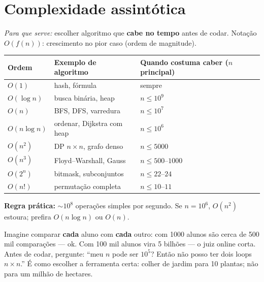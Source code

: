 
\section{Complexidade assintótica}

\emph{Para que serve:} escolher algoritmo que \textbf{cabe no tempo} antes de codar.
Notação $O(f(n))$: crescimento no pior caso (ordem de magnitude).

\begin{center}
\begin{tabular}{@{}p{2.2cm}p{4.2cm}p{5.5cm}@{}}
  \toprule
  Ordem & Exemplo de algoritmo & Quando costuma caber ($n$ principal) \\
  \midrule
  $O(1)$ & hash, fórmula & sempre \\
  $O(\log n)$ & busca binária, heap & $n \le 10^9$ \\
  $O(n)$ & BFS, DFS, varredura & $n \le 10^7$ \\
  $O(n \log n)$ & ordenar, Dijkstra com heap & $n \le 10^6$ \\
  $O(n^2)$ & DP $n\times n$, grafo denso & $n \le 5000$ \\
  $O(n^3)$ & Floyd--Warshall, Gauss & $n \le 500$--$1000$ \\
  $O(2^n)$ & bitmask, subconjuntos & $n \le 22$--$24$ \\
  $O(n!)$ & permutação completa & $n \le 10$--$11$ \\
  \bottomrule
\end{tabular}
\end{center}

\textbf{Regra prática:} $\sim 10^8$ operações simples por segundo. Se $n = 10^6$, $O(n^2)$ estoura; prefira $O(n\log n)$ ou $O(n)$.

\begin{exemplodiabox}
Imagine comparar \textbf{cada} aluno com \textbf{cada} outro: com 1000 alunos são cerca de 500 mil comparações --- ok. Com 100 mil alunos vira 5 bilhões --- o juiz online corta. Antes de codar, pergunte: ``meu $n$ pode ser $10^5$? Então não posso ter dois loops $n \times n$.'' É como escolher a ferramenta certa: colher de jardim para 10 plantas; não para um milhão de hectares.
\end{exemplodiabox}


